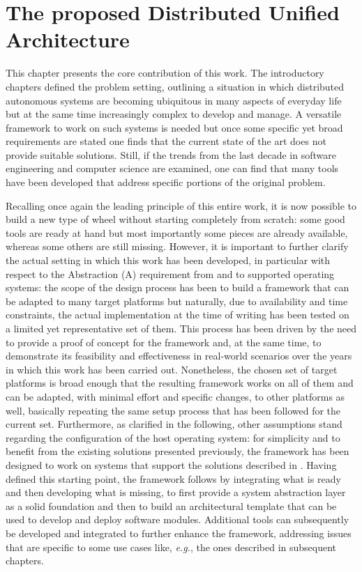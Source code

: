\chapter{The proposed Distributed Unified Architecture}
\label{ch:dua}
\vspace{-.5cm}

This chapter presents the core contribution of this work. The introductory chapters defined the problem setting, outlining a situation in which distributed autonomous systems are becoming ubiquitous in many aspects of everyday life but at the same time increasingly complex to develop and manage. A versatile framework to work on such systems is needed but once some specific yet broad requirements are stated one finds that the current state of the art does not provide suitable solutions. Still, if the trends from the last decade in software engineering and computer science are examined, one can find that many tools have been developed that address specific portions of the original problem.

Recalling once again the leading principle of this entire work, it is now possible to build a new type of wheel without starting completely from scratch: some good tools are ready at hand but most importantly some pieces are already available, whereas some others are still missing. However, it is important to further clarify the actual setting in which this work has been developed, in particular with respect to the Abstraction (A) requirement from  and to supported operating systems: the scope of the design process has been to build a framework that can be adapted to many target platforms but naturally, due to availability and time constraints, the actual implementation at the time of writing has been tested on a limited yet representative set of them. This process has been driven by the need to provide a proof of concept for the framework and, at the same time, to demonstrate its feasibility and effectiveness in real-world scenarios over the years in which this work has been carried out. Nonetheless, the chosen set of target platforms is broad enough that the resulting framework works on all of them and can be adapted, with minimal effort and specific changes, to other platforms as well, basically repeating the same setup process that has been followed for the current set. Furthermore, as clarified in the following, other assumptions stand regarding the configuration of the host operating system: for simplicity and to benefit from the existing solutions presented previously, the framework has been designed to work on systems that support the solutions described in . Having defined this starting point, the framework follows by integrating what is ready and then developing what is missing, to first provide a system abstraction layer as a solid foundation and then to build an architectural template that can be used to develop and deploy software modules. Additional tools can subsequently be developed and integrated to further enhance the framework, addressing issues that are specific to some use cases like, \emph{e.g.}, the ones described in subsequent chapters.

